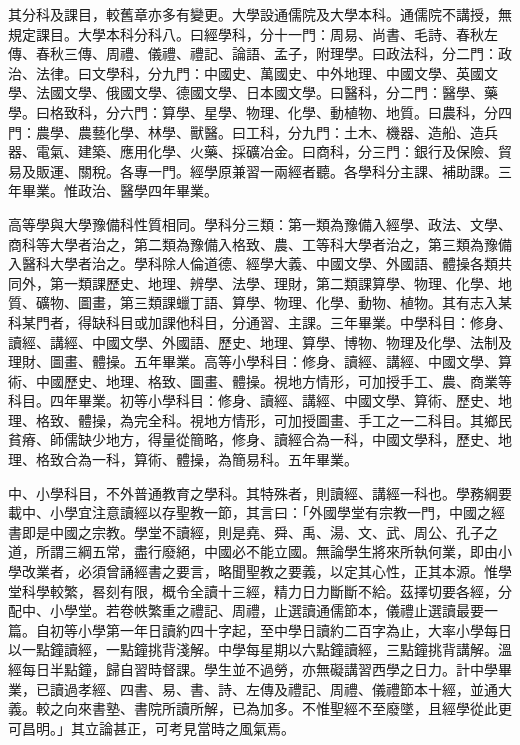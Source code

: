 \begin{pinyinscope}
其分科及課目，較舊章亦多有變更。大學設通儒院及大學本科。通儒院不講授，無規定課目。大學本科分科八。曰經學科，分十一門：周易、尚書、毛詩、春秋左傳、春秋三傳、周禮、儀禮、禮記、論語、孟子，附理學。曰政法科，分二門：政治、法律。曰文學科，分九門：中國史、萬國史、中外地理、中國文學、英國文學、法國文學、俄國文學、德國文學、日本國文學。曰醫科，分二門：醫學、藥學。曰格致科，分六門：算學、星學、物理、化學、動植物、地質。曰農科，分四門：農學、農藝化學、林學、獸醫。曰工科，分九門：土木、機器、造船、造兵器、電氣、建築、應用化學、火藥、採礦冶金。曰商科，分三門：銀行及保險、貿易及販運、關稅。各專一門。經學原兼習一兩經者聽。各學科分主課、補助課。三年畢業。惟政治、醫學四年畢業。

高等學與大學豫備科性質相同。學科分三類：第一類為豫備入經學、政法、文學、商科等大學者治之，第二類為豫備入格致、農、工等科大學者治之，第三類為豫備入醫科大學者治之。學科除人倫道德、經學大義、中國文學、外國語、體操各類共同外，第一類課歷史、地理、辨學、法學、理財，第二類課算學、物理、化學、地質、礦物、圖畫，第三類課蠟丁語、算學、物理、化學、動物、植物。其有志入某科某門者，得缺科目或加課他科目，分通習、主課。三年畢業。中學科目：修身、讀經、講經、中國文學、外國語、歷史、地理、算學、博物、物理及化學、法制及理財、圖畫、體操。五年畢業。高等小學科目：修身、讀經、講經、中國文學、算術、中國歷史、地理、格致、圖畫、體操。視地方情形，可加授手工、農、商業等科目。四年畢業。初等小學科目：修身、讀經、講經、中國文學、算術、歷史、地理、格致、體操，為完全科。視地方情形，可加授圖畫、手工之一二科目。其鄉民貧瘠、師儒缺少地方，得量從簡略，修身、讀經合為一科，中國文學科，歷史、地理、格致合為一科，算術、體操，為簡易科。五年畢業。

中、小學科目，不外普通教育之學科。其特殊者，則讀經、講經一科也。學務綱要載中、小學宜注意讀經以存聖教一節，其言曰：「外國學堂有宗教一門，中國之經書即是中國之宗教。學堂不讀經，則是堯、舜、禹、湯、文、武、周公、孔子之道，所謂三綱五常，盡行廢絕，中國必不能立國。無論學生將來所執何業，即由小學改業者，必須曾誦經書之要言，略聞聖教之要義，以定其心性，正其本源。惟學堂科學較繁，晷刻有限，概令全讀十三經，精力日力斷斷不給。茲擇切要各經，分配中、小學堂。若卷帙繁重之禮記、周禮，止選讀通儒節本，儀禮止選讀最要一篇。自初等小學第一年日讀約四十字起，至中學日讀約二百字為止，大率小學每日以一點鐘讀經，一點鐘挑背淺解。中學每星期以六點鐘讀經，三點鐘挑背講解。溫經每日半點鐘，歸自習時督課。學生並不過勞，亦無礙講習西學之日力。計中學畢業，已讀過孝經、四書、易、書、詩、左傳及禮記、周禮、儀禮節本十經，並通大義。較之向來書塾、書院所讀所解，已為加多。不惟聖經不至廢墜，且經學從此更可昌明。」其立論甚正，可考見當時之風氣焉。


\end{pinyinscope}
